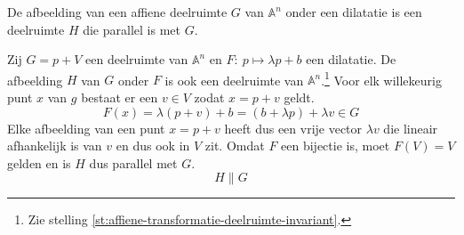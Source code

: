 \documentclass[main.tex]{subfiles}
\begin{document}
\begin{st}
  De afbeelding van een affiene deelruimte $G$ van $\mathbb{A}^{n}$ onder een dilatatie is een deelruimte $H$ die parallel is met $G$.

  \begin{st}
    Zij $G = p + V$ een deelruimte van $\mathbb{A}^{n}$ en $F:\ p \mapsto \lambda p + b$ een dilatatie.
    De afbeelding $H$ van $G$ onder $F$ is ook een deelruimte van $\mathbb{A}^{n}$.\footnote{Zie stelling \ref{st:affiene-transformatie-deelruimte-invariant}.}
    Voor elk willekeurig punt $x$ van $g$ bestaat er een $v\in V$ zodat $x = p+v$ geldt.
    \[ F(x) = \lambda(p+v) + b = (b + \lambda p) + \lambda v \in G \]
    Elke afbeelding van een punt $x= p+v$ heeft dus een vrije vector $\lambda v$ die lineair afhankelijk is van $v$ en dus ook in $V$ zit.
    Omdat $F$ een bijectie is, moet $F(V) = V$ gelden en is $H$ dus parallel met $G$.
    \[ H \parallel G \]
  \end{st}
\end{st}
\end{document}
